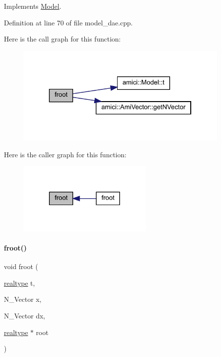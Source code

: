 Implements \mbox{\hyperlink{classamici_1_1_model_a9124751917d81611cc237c853d9cf6b6}{Model}}.



Definition at line 70 of file model\+\_\+dae.\+cpp.

Here is the call graph for this function\+:
\nopagebreak
\begin{figure}[H]
\begin{center}
\leavevmode
\includegraphics[width=298pt]{classamici_1_1_model___d_a_e_a94a623b51fd0ecd7a9a549eb7da2fc04_cgraph}
\end{center}
\end{figure}
Here is the caller graph for this function\+:
\nopagebreak
\begin{figure}[H]
\begin{center}
\leavevmode
\includegraphics[width=188pt]{classamici_1_1_model___d_a_e_a94a623b51fd0ecd7a9a549eb7da2fc04_icgraph}
\end{center}
\end{figure}
\mbox{\label{classamici_1_1_model___d_a_e_ae6c3d021c2ba942652b6dbd4355e8968}} 
\paragraph{\texorpdfstring{froot()}{froot()}\hspace{0.1cm}{\footnotesize\ttfamily [2/3]}}
{\footnotesize\ttfamily void froot (\begin{DoxyParamCaption}\item[{\mbox{\hyperlink{namespaceamici_a1bdce28051d6a53868f7ccbf5f2c14a3}{realtype}}}]{t,  }\item[{N\+\_\+\+Vector}]{x,  }\item[{N\+\_\+\+Vector}]{dx,  }\item[{\mbox{\hyperlink{namespaceamici_a1bdce28051d6a53868f7ccbf5f2c14a3}{realtype}} $\ast$}]{root }\end{DoxyParamCaption})}

